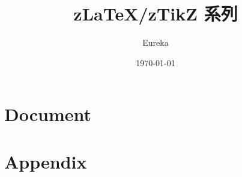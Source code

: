 \documentclass[
    lang=cn, 
    layout=oneside, 
    margin=false, 
    math-alias=true,
    toc={rename, 2column},
]{zlatex}
\title{z\LaTeX{}/zTikZ 系列}
\author{Eureka}
\date{\today}
\begin{document}
\maketitle
\frontmatter
\tableofcontents
\mainmatter
\part{Document}


\printindex


\part{Appendix}


\end{document}
